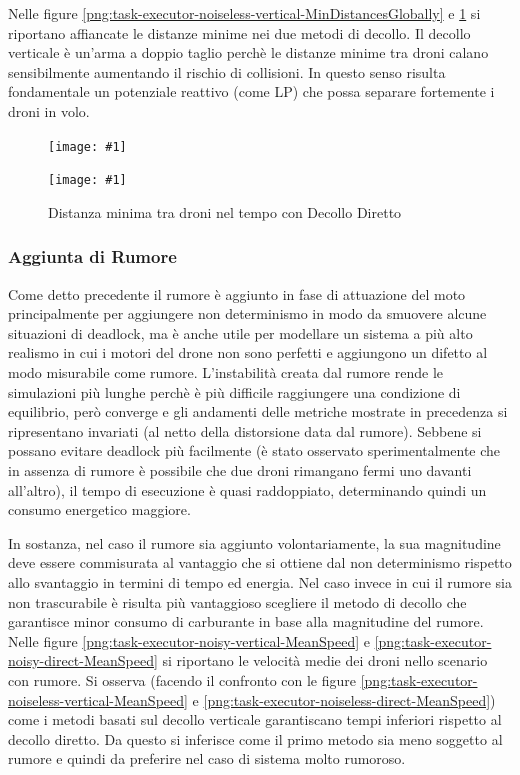 \documentclass[a4paper,11pt,oneside, table]{article}
\newcommand{\putsubimage}[5] {
  \begin{minipage}{{#4}\linewidth}
	    \centering
      \texttt{[image: \#1]}
	    \caption{#2}\label{#3}
	\end{minipage}
}
\newcommand{\putimagecouple}[2] {
  \begin{figure}[!htb]
      \centering
      #1
      \hspace{0.5cm}
      #2
  \end{figure}
}
\begin{document}
Nelle figure \ref{png:task-executor-noiseless-vertical-MinDistancesGlobally} e \ref{png:task-executor-noiseless-direct-MinDistancesGlobally} si riportano affiancate le distanze minime nei due metodi di decollo.
Il decollo verticale \`e un'arma a doppio taglio perch\`e le distanze minime tra droni calano sensibilmente aumentando il rischio di collisioni.
In questo senso risulta fondamentale un potenziale reattivo (come LP) che possa separare fortemente i droni in volo.

\putimagecouple
{\putsubimage{images/experiments/task-executor-noiseless-vertical/MinDistancesGlobally.png}{Distanza minima tra droni nel tempo con Decollo Verticale}{png:task-executor-noiseless-vertical-MinDistancesGlobally}{0.4}{0.99}}
{\putsubimage{images/experiments/task-executor-noiseless-direct/MinDistancesGlobally.png}{Distanza minima tra droni nel tempo con Decollo Diretto}{png:task-executor-noiseless-direct-MinDistancesGlobally}{0.4}{0.99}}

\subsubsection{Aggiunta di Rumore}

Come detto precedente il rumore \`e aggiunto in fase di attuazione del moto principalmente per aggiungere non determinismo in modo da smuovere alcune situazioni di deadlock, ma \`e anche utile per modellare un sistema a pi\`u alto realismo in cui i motori del drone non sono perfetti e aggiungono un difetto al modo misurabile come rumore.
L'instabilit\`a creata dal rumore rende le simulazioni pi\`u lunghe perch\`e \`e pi\`u difficile raggiungere una condizione di equilibrio, per\`o converge e gli andamenti delle metriche mostrate in precedenza si ripresentano invariati (al netto della distorsione data dal rumore).
Sebbene si possano evitare deadlock pi\`u facilmente (\`e stato osservato sperimentalmente che in assenza di rumore \`e possibile che due droni rimangano fermi uno davanti all'altro), il tempo di esecuzione \`e quasi raddoppiato, determinando quindi un consumo energetico maggiore.

In sostanza, nel caso il rumore sia aggiunto volontariamente, la sua magnitudine deve essere commisurata al vantaggio che si ottiene dal non determinismo rispetto allo svantaggio in termini di tempo ed energia.
Nel caso invece in cui il rumore sia non trascurabile \`e risulta pi\`u vantaggioso scegliere il metodo di decollo che garantisce minor consumo di carburante in base alla magnitudine del rumore.
Nelle figure \ref{png:task-executor-noisy-vertical-MeanSpeed} e \ref{png:task-executor-noisy-direct-MeanSpeed} si riportano le velocit\`a medie dei droni nello scenario con rumore.
Si osserva (facendo il confronto con le figure \ref{png:task-executor-noiseless-vertical-MeanSpeed} e \ref{png:task-executor-noiseless-direct-MeanSpeed}) come i metodi basati sul decollo verticale garantiscano tempi inferiori rispetto al decollo diretto.
Da questo si inferisce come il primo metodo sia meno soggetto al rumore e quindi da preferire nel caso di sistema molto rumoroso.
\end{document}
